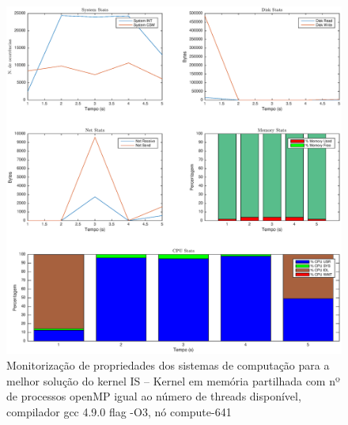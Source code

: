 \documentclass[conference,compsoc]{IEEEtran}
\begin{document}
 \begin{figure}
\centering
\includegraphics[width=1\textwidth]{EPS/DSTAT/IS_OMP_24_GCC.eps}
\caption{Monitorização de propriedades dos sistemas de computação para a melhor solução do kernel IS -- Kernel em memória partilhada com nº de processos openMP igual ao número de threads disponível, compilador gcc 4.9.0 flag -O3, nó compute-641}
\label{dstat_is}
\end{figure}
\end{document}
